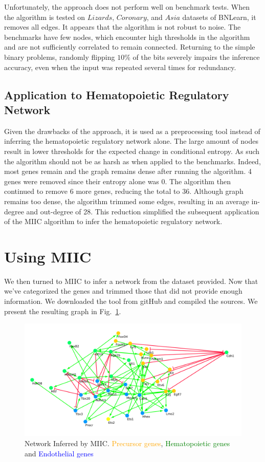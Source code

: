 \documentclass[a4paper,12pt]{book}
\theoremstyle{break}
\begin{document}
 Unfortunately, the approach does not perform well on benchmark tests. When the algorithm is tested on $Lizards$, $Coronary$, and $Asia$ datasets of BNLearn, it removes all edges. It appears that the algorithm is not robust to noise. The benchmarks have few nodes, which encounter high thresholds in the algorithm and are not sufficiently correlated to remain connected. Returning to the simple binary problems, randomly flipping $10\%$ of the bits severely impairs the inference accuracy, even when the input was repeated several times for redundancy. 
 \\
 
 \subsection*{Application to Hematopoietic Regulatory Network}
 Given the drawbacks of the approach, it is used as a preprocessing tool instead of inferring the hematopoietic regulatory network alone. The large amount of nodes result in lower thresholds for the expected change in conditional entropy. As such the algorithm should not be as harsh as when applied to the benchmarks. Indeed, most genes remain and the graph remains dense after running the algorithm. 4 genes were removed since their entropy alone was 0. The algorithm then continued to remove 6 more genes, reducing the total to 36. Although graph remains too dense, the algorithm trimmed some edges, resulting in an average in-degree and out-degree of 28. This reduction simplified the subsequent application of the MIIC algorithm to infer the hematopoietic regulatory network.
 
\section*{Using MIIC}
	We then turned to MIIC to infer a network from the dataset provided. Now that we've categorized the genes and trimmed those that did not provide enough information. We downloaded the tool from gitHub and compiled the sources. We present the resulting graph in Fig.~\ref{fig:miicnetwork}.
	\begin{figure}[h!]
		\centering
		\includegraphics[width =\linewidth]{../Datasets/miic-trimmed/miic-trimmed.png}
		\caption{Network Inferred by MIIC. \textcolor{orange}{Precursor genes}, \textcolor{green}{ Hematopoietic genes} and  \textcolor{blue}{Endothelial genes}}
		\label{fig:miicnetwork}
	\end{figure}
\end{document}
